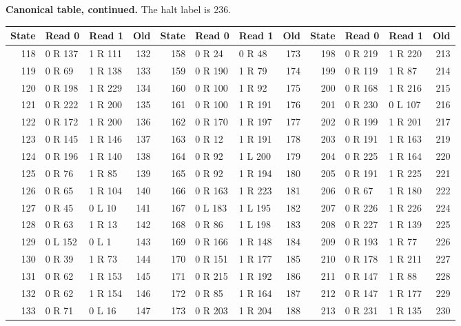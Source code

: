 \clearpage
\noindent\textbf{Canonical table, continued.} The halt label is 236.\par\medskip
\begin{center}
\begin{tabular}{@{}rllr@{\hspace{12pt}}rllr@{\hspace{12pt}}rllr@{}}
\toprule
State & Read 0 & Read 1 & Old & State & Read 0 & Read 1 & Old & State & Read 0 & Read 1 & Old\\
\midrule
118 & 0 R 137 & 1 R 111 & 132 & 158 & 0 R 24 & 0 R 48 & 173 & 198 & 0 R 219 & 1 R 220 & 213\\
119 & 0 R 69 & 1 R 138 & 133 & 159 & 0 R 190 & 1 R 79 & 174 & 199 & 0 R 119 & 1 R 87 & 214\\
120 & 0 R 198 & 1 R 229 & 134 & 160 & 0 R 100 & 1 R 92 & 175 & 200 & 0 R 168 & 1 R 216 & 215\\
121 & 0 R 222 & 1 R 200 & 135 & 161 & 0 R 100 & 1 R 191 & 176 & 201 & 0 R 230 & 0 L 107 & 216\\
122 & 0 R 172 & 1 R 200 & 136 & 162 & 0 R 170 & 1 R 197 & 177 & 202 & 0 R 199 & 1 R 201 & 217\\
123 & 0 R 145 & 1 R 146 & 137 & 163 & 0 R 12 & 1 R 191 & 178 & 203 & 0 R 191 & 1 R 163 & 219\\
124 & 0 R 196 & 1 R 140 & 138 & 164 & 0 R 92 & 1 L 200 & 179 & 204 & 0 R 225 & 1 R 164 & 220\\
125 & 0 R 76 & 1 R 85 & 139 & 165 & 0 R 92 & 1 R 194 & 180 & 205 & 0 R 191 & 1 R 225 & 221\\
126 & 0 R 65 & 1 R 104 & 140 & 166 & 0 R 163 & 1 R 223 & 181 & 206 & 0 R 67 & 1 R 180 & 222\\
127 & 0 R 45 & 0 L 10 & 141 & 167 & 0 L 183 & 1 L 195 & 182 & 207 & 0 R 226 & 1 R 226 & 224\\
128 & 0 R 63 & 1 R 13 & 142 & 168 & 0 R 86 & 1 L 198 & 183 & 208 & 0 R 227 & 1 R 139 & 225\\
129 & 0 L 152 & 0 L 1 & 143 & 169 & 0 R 166 & 1 R 148 & 184 & 209 & 0 R 193 & 1 R 77 & 226\\
130 & 0 R 39 & 1 R 73 & 144 & 170 & 0 R 151 & 1 R 177 & 185 & 210 & 0 R 178 & 1 R 211 & 227\\
131 & 0 R 62 & 1 R 153 & 145 & 171 & 0 R 215 & 1 R 192 & 186 & 211 & 0 R 147 & 1 R 88 & 228\\
132 & 0 R 62 & 1 R 154 & 146 & 172 & 0 R 85 & 1 R 164 & 187 & 212 & 0 R 147 & 1 R 177 & 229\\
133 & 0 R 71 & 0 L 16 & 147 & 173 & 0 R 203 & 1 R 204 & 188 & 213 & 0 R 231 & 1 R 135 & 230\\

\end{tabular}
\end{center}
